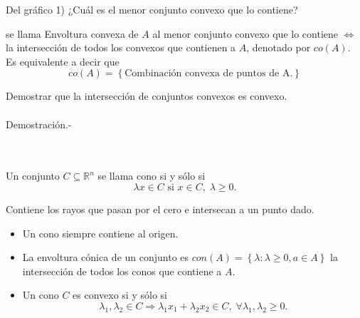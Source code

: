 Del gráfico 1) ¿Cuál es el menor conjunto convexo que lo contiene?
\begin{center}
\end{center}

\begin{def.}
    se llama Envoltura convexa de $A$ al menor conjunto convexo que lo contiene $\Leftrightarrow$ la intersección de todos los convexos que contienen a $A$, denotado por $co(A)$.
    Es equivalente a decir que
    $$co(A)=\left\{\mbox{Combinación convexa de puntos de A.}\right\}$$
\end{def.}

\begin{ejer}
    Demostrar que la intersección de conjuntos convexos es convexo.\\\\
	Demostración.-\; 
\end{ejer}


\begin{def.}[Cono]\,\\\\
    Un conjunto $C\subseteq \mathbb{R}^n$ se llama cono si y sólo si
    $$\lambda x\in C \mbox{ si } x\in C,\; \lambda \geq 0.$$

    Contiene los rayos que pasan por el cero e intersecan a un punto dado.
    \begin{itemize}
	\item Un cono siempre contiene al origen.
	\item La envoltura cónica de un conjunto es $con(A)=\left\{\lambda : \lambda \geq 0, a\in A\right\}$ la intersección de todos los conos que contiene a $A$.
	\item Un cono $C$ es convexo si y sólo si 
	$$\lambda_1,\lambda_2\in C \Rightarrow \lambda_1x_1+\lambda_2x_2\in C, \; \forall \lambda_1,\lambda_2 \geq 0.$$
    \end{itemize}
\end{def.}

